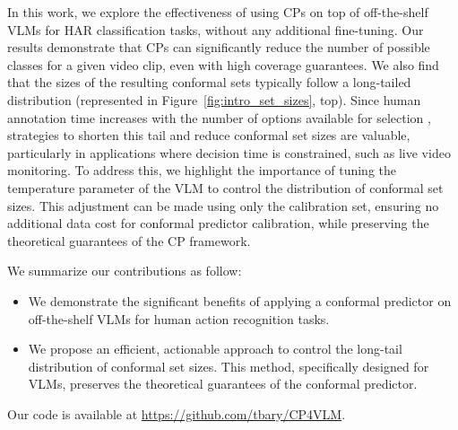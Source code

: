 
In this work, we explore the effectiveness of using CPs on top of off-the-shelf VLMs for HAR classification tasks, without any additional fine-tuning. Our results demonstrate that CPs can significantly reduce the number of possible classes for a given video clip, even with high coverage guarantees. We also find that the sizes of the resulting conformal sets typically follow a long-tailed distribution (represented in Figure~\ref{fig:intro_set_sizes}, top). Since human annotation time increases with the number of options available for selection \cite{straitouridesigning, hick1952rate, landauer1985selection}, strategies to shorten this tail and reduce conformal set sizes are valuable, particularly in applications where decision time is constrained, such as live video monitoring. To address this, we highlight the importance of tuning the temperature parameter of the VLM to control the distribution of conformal set sizes. This adjustment can be made using only the calibration set, ensuring no additional data cost for conformal predictor calibration, while preserving the theoretical guarantees of the CP framework.



We summarize our contributions as follow:
\begin{itemize}
\item We demonstrate the significant benefits of applying a conformal predictor on off-the-shelf VLMs for human action recognition tasks.
\item We propose an efficient, actionable approach to control the long-tail distribution of conformal set sizes. This method, specifically designed for VLMs, preserves the theoretical guarantees of the conformal predictor.
\end{itemize}
Our code is available at \href{https://github.com/tbary/CP4VLM}{https://github.com/tbary/CP4VLM}.
